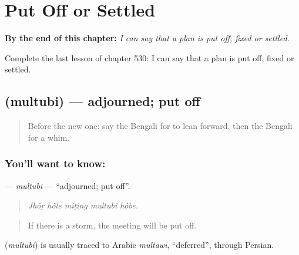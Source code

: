 
\chapter{Put Off or Settled}
\label{ch:bn-put-off-or-settled}

\begin{chapteropening}
\textbf{By the end of this chapter:} \emph{I can say that a plan is put off, fixed or settled.}

Complete the last lesson of chapter 530: I can say that a plan is put off, fixed or settled.
\end{chapteropening}

\section[\texorpdfstring{\bn{মুলতুবি} (multubi)}{মুলতুবি (multubi)}]{ (multubi) — adjourned; put off}

\label{lesson:BN-C530-multubi}



\begin{quote}
Before the new one: say the Bengali for to lean forward, then the Bengali for a whim.
\end{quote}

\subsection*{You'll want to know: }
\textbf{} — \emph{multubi} — \textquotedblleft{}adjourned; put off\textquotedblright{}.

\begin{quote}
    
\end{quote}

\begin{quote}
\emph{Jhôṛ hôle miṭing multubi hôbe.}
\end{quote}

\begin{quote}
If there is a storm, the meeting will be put off.
\end{quote}

\begin{cousinweb}
\textbf{} (\emph{multubi}) is usually traced to Arabic \emph{multawī}, \textquotedblleft{}deferred\textquotedblright{}, through Persian.
\end{cousinweb}

